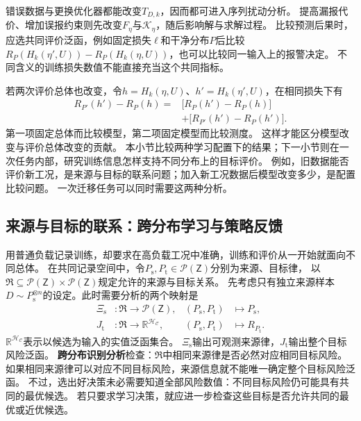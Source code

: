 错误数据与更换优化器都能改变$T_{D,k}$，因而都可进入序列扰动分析。
提高漏报代价、增加误报约束则先改变$F_\eta$与$\mathcal K_\eta$，随后影响解与求解过程。
比较预测后果时，应选共同评价泛函，例如固定损失$\ell$和干净分布$P$后比较
$R_P(H_k(\eta',U))-R_P(H_k(\eta,U))$，也可以比较同一输入上的报警决定。
不同含义的训练损失数值不能直接充当这个共同指标。

若两次评价总体也改变，令$h=H_k(\eta,U)$、$h'=H_k(\eta',U)$，在相同损失下有
\[
  \begin{aligned}
    R_{P'}(h')-R_P(h)
    ={}&\bigl[R_P(h')-R_P(h)\bigr]\\
       &+\bigl[R_{P'}(h')-R_P(h')\bigr].
  \end{aligned}
\]
第一项固定总体而比较模型，第二项固定模型而比较测度。
这样才能区分模型改变与评价总体改变的贡献。
本小节比较两种学习配置下的结果；下一小节则在一次任务内部，研究训练信息怎样支持不同分布上的目标评价。
例如，旧数据能否评价新工况，是来源与目标的联系问题；加入新工况数据后模型改变多少，是配置比较问题。
一次迁移任务可以同时需要这两种分析。

\subsection{来源与目标的联系：跨分布学习与策略反馈}
\label{sec:future-ml-adaptation-feedback}

用普通负载记录训练，却要求在高负载工况中准确，训练和评价从一开始就面向不同总体。
在共同记录空间中，令$P_{\mathrm s},P_{\mathrm t}\in\mathcal P(\mathsf Z)$分别为来源、目标律，
以$\mathfrak R\subseteq\mathcal P(\mathsf Z)\times\mathcal P(\mathsf Z)$规定允许的来源与目标关系。
先考虑只有独立来源样本$D\sim P_{\mathrm s}^{\otimes n}$的设定。此时需要分析的两个映射是
\begin{equation}
  \begin{aligned}
    \Xi_{\mathrm s}&:\mathfrak R\to\mathcal P(\mathsf Z),
      &(P_{\mathrm s},P_{\mathrm t})&\mapsto P_{\mathrm s},\\
    J_{\mathrm t}&:\mathfrak R\to\mathbb R^{\mathcal H_{\mathcal C}},
      &(P_{\mathrm s},P_{\mathrm t})&\mapsto R_{P_{\mathrm t}}.
  \end{aligned}
  \label{eq:future-task-source-target-maps}
\end{equation}
$\mathbb R^{\mathcal H_{\mathcal C}}$表示以候选为输入的实值泛函集合。
$\Xi_{\mathrm s}$输出可观测来源律，$J_{\mathrm t}$输出整个目标风险泛函。
\textbf{跨分布识别分析}检查：$\mathfrak R$中相同来源律是否必然对应相同目标风险。
如果相同来源律可以对应不同目标风险，来源信息就不能唯一确定整个目标风险泛函。
不过，选出好决策未必需要知道全部风险数值：不同目标风险仍可能具有共同的最优候选。
若只要求学习决策，就应进一步检查这些目标是否允许共同的最优或近优候选。

